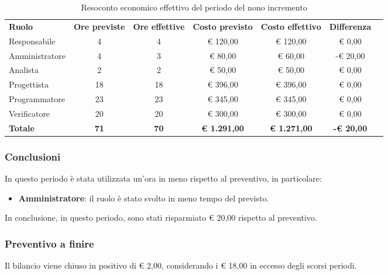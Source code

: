 \documentclass[../piano-di-progetto.tex]{subfiles}
\begin{document}
  \begin{table}[H]
    \centering
    \begin{tabular}{lcccccc}
      \rowcolor{lightgray}
      \textbf{Ruolo}  & \textbf{Ore previste} & \textbf{Ore effettive} & \textbf{Costo previsto} & \textbf{Costo effettivo} & \textbf{Differenza} \\
Responsabile    & 4           & 4           & € 120,00            & € 120,00            & € 0,00            \\
Amministratore  & 4           & 3           & € 80,00             & € 60,00             & -€ 20,00          \\
Analista        & 2           & 2           & € 50,00             & € 50,00             & € 0,00            \\
Progettista     & 18          & 18          & € 396,00            & € 396,00            & € 0,00            \\
Programmatore   & 23          & 23          & € 345,00            & € 345,00            & € 0,00            \\
Verificatore    & 20          & 20          & € 300,00            & € 300,00            & € 0,00            \\
\textbf{Totale} & \textbf{71} & \textbf{70} & \textbf{€ 1.291,00} & \textbf{€ 1.271,00} & \textbf{-€ 20,00}

    \end{tabular}
    \caption{Resoconto economico effettivo del periodo del nono incremento}
  \end{table}

\subsubsection{Conclusioni}
In questo periodo è stata utilizzata un'ora in meno rispetto al preventivo, in particolare:
\begin{itemize}
    \item \textbf{Amministratore}: il ruolo è stato svolto in meno tempo del previsto.
\end{itemize}
In conclusione, in questo periodo, sono stati risparmiato € 20,00 rispetto al preventivo.

\subsubsection{Preventivo a finire}
Il bilancio viene chiuso in positivo di € 2,00, considerando i € 18,00 in eccesso degli scorsi periodi. 
\end{document}
